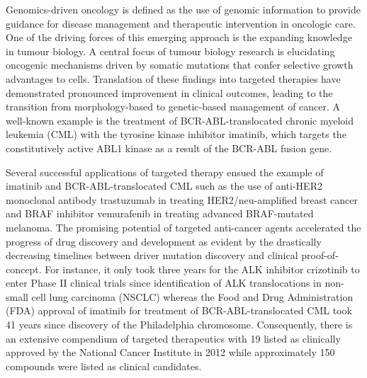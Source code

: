 Genomics-driven oncology is defined as the use of genomic information to provide guidance for disease management and therapeutic intervention in oncologic care. One of the driving forces of this emerging approach is the expanding knowledge in tumour biology. A central focus of tumour biology research is elucidating oncogenic mechanisms driven by somatic mutations that confer selective growth advantages to cells. Translation of these findings into targeted therapies have demonstrated pronounced improvement in clinical outcomes, leading to the transition from morphology-based to genetic-based management of cancer. A well-known example is the treatment of BCR-ABL-translocated chronic myeloid leukemia (CML) with the tyrosine kinase inhibitor imatinib, which targets the constitutively active ABL1 kinase as a result of the BCR-ABL fusion gene.

Several successful applications of targeted therapy ensued the example of imatinib and BCR-ABL-translocated CML such as the use of anti-HER2 monoclonal antibody trastuzumab in treating HER2/neu-amplified breast cancer and BRAF inhibitor vemurafenib in treating advanced BRAF-mutated melanoma. The promising potential of targeted anti-cancer agents accelerated the progress of drug discovery and development as evident by the drastically decreasing timelines between driver mutation discovery and clinical proof-of-concept. For instance, it only took three years for the ALK inhibitor crizotinib to enter Phase II clinical trials since identification of ALK translocations in non-small cell lung carcinoma (NSCLC) whereas the Food and Drug Administration (FDA) approval of imatinib for treatment of BCR-ABL-translocated CML took 41 years since discovery of the Philadelphia chromosome. Consequently, there is an extensive compendium of targeted therapeutics with 19 listed as clinically approved by the National Cancer Institute in 2012 while approximately 150 compounds were listed as clinical candidates.

